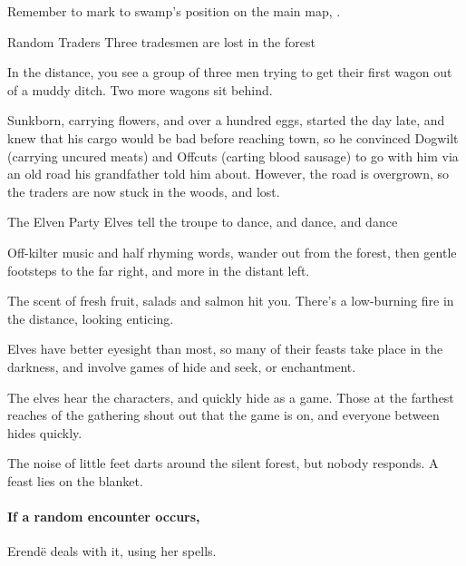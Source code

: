 Remember to mark to swamp's position on the main map, .

{Random Traders}%
{Three tradesmen are lost in the forest}%

\begin{boxtext}
  In the distance, you see a group of three men trying to get their first wagon out of a muddy ditch.
  Two more wagons sit behind.
\end{boxtext}

Sunkborn, carrying flowers, and over a hundred eggs, started the day late, and knew that his cargo would be bad before reaching \gls{town}, so he convinced Dogwilt (carrying uncured meats) and Offcuts (carting blood sausage) to go with him via an old road his grandfather told him about.
However, the road is overgrown, so the traders are now stuck in the woods, and lost.



{The Elven Party}%
{Elves tell the troupe to dance, and dance, and dance}%

\begin{boxtext}
  Off-kilter music and half rhyming words, wander out from the forest, then gentle footsteps to the far right, and more in the distant left.

  The scent of fresh fruit, salads and salmon hit you.  There's a low-burning fire in the distance, looking enticing.
\end{boxtext}

Elves have better eyesight than most, so many of their feasts take place in the darkness, and involve games of hide and seek, or enchantment.

The elves hear the characters, and quickly hide as a game.  Those at the farthest reaches of the gathering shout out that the game is on, and everyone between hides quickly.

\begin{boxtext}
  The noise of little feet darts around the silent forest, but nobody responds.
  A feast lies on the blanket.
\end{boxtext}

\paragraph{If a random encounter occurs,}
Erend\"e deals with it, using her spells.

